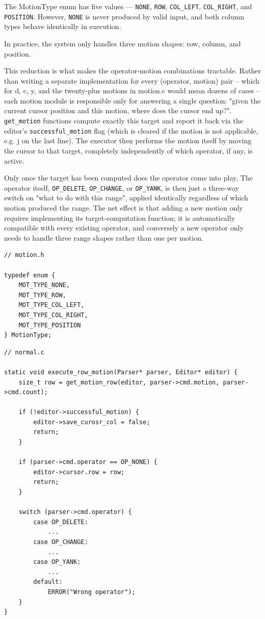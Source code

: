 \documentclass[journal]{IEEEtran}
\begin{document}
The MotionType enum has five values --- \texttt{NONE}, \texttt{ROW}, \texttt{COL\_LEFT}, \texttt{COL\_RIGHT}, and \texttt{POSITION}. However, \texttt{NONE} is never produced by valid input, and both column types behave identically in execution.

In practice, the system only handles three motion shapes: row, column, and position.

This reduction is what makes the operator-motion combinations tractable. Rather than writing a separate implementation for every (operator, motion) pair -- which for d, c, y, and the twenty-plus motions in motion.c would mean dozens of cases -- each motion module is responsible only for answering a single question: "given the current cursor position and this motion, where does the cursor end up?". \texttt{get\_motion} functions compute exactly this target and report it back via the editor's \texttt{successful\_motion} flag (which is cleared if the motion is not applicable, e.g. j on the last line). The executor then performs the motion itself by moving the cursor to that target, completely independently of which operator, if any, is active.

Only once the target has been computed does the operator come into play. The operator itself, \texttt{OP\_DELETE}, \texttt{OP\_CHANGE}, or \texttt{OP\_YANK}, is then just a three-way switch on "what to do with this range", applied identically regardless of which motion produced the range. The net effect is that adding a new motion only requires implementing its target-computation function; it is automatically compatible with every existing operator, and conversely a new operator only needs to handle three range shapes rather than one per motion.

\begin{verbatim}
// motion.h

typedef enum {
    MOT_TYPE_NONE,
    MOT_TYPE_ROW,
    MOT_TYPE_COL_LEFT,
    MOT_TYPE_COL_RIGHT,
    MOT_TYPE_POSITION
} MotionType;
\end{verbatim}

\begin{verbatim}
// normal.c

static void execute_row_motion(Parser* parser, Editor* editor) {
    size_t row = get_motion_row(editor, parser->cmd.motion, parser->cmd.count);

    if (!editor->successful_motion) {
        editor->save_curosr_col = false;
        return;
    }

    if (parser->cmd.operator == OP_NONE) {
        editor->cursor.row = row;
        return;
    }

    switch (parser->cmd.operator) {
        case OP_DELETE:
            ...
        case OP_CHANGE:
            ...
        case OP_YANK:
            ...
        default:
            ERROR("Wrong operator");
    }
}
\end{verbatim}
\end{document}
